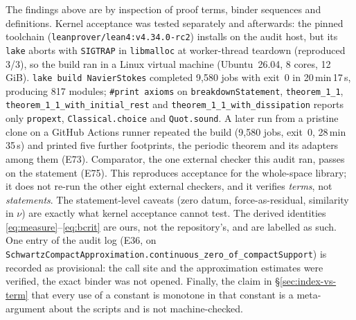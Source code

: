 \documentclass[11pt]{article}
\newcommand{\ct}[1]{\texttt{#1}}
\theoremstyle{plain}
\theoremstyle{definition}
\theoremstyle{remark}
\begin{document}
The findings above are by inspection of proof terms, binder sequences and
definitions. Kernel acceptance was tested separately and afterwards: the pinned
toolchain (\ct{leanprover/lean4:v4.34.0-rc2}) installs on the audit host, but its
\ct{lake} aborts with \ct{SIGTRAP} in \ct{libmalloc} at worker-thread teardown
(reproduced 3/3), so the build ran in a Linux virtual machine (Ubuntu~26.04,
8 cores, 12\,GiB). \ct{lake build NavierStokes} completed 9,580 jobs with exit~0
in 20\,min\,17\,s, producing 817 modules; \ct{\#print axioms} on
\ct{breakdownStatement}, \ct{theorem\_1\_1},
\ct{theorem\_1\_1\_with\_initial\_rest} and
\ct{theorem\_1\_1\_with\_dissipation} reports only \ct{propext},
\ct{Classical.choice} and \ct{Quot.sound}. A later run from a pristine clone on a
GitHub Actions runner repeated the build (9,580 jobs, exit~0, 28\,min\,35\,s) and
printed five further footprints, the periodic theorem and its adapters among them
(E73). Comparator, the one external checker this audit ran, passes on the statement (E75). This reproduces acceptance for the
whole-space library; it does not re-run the other eight external checkers, and it
verifies \emph{terms}, not \emph{statements}. The statement-level caveats (zero
datum, force-as-residual, similarity in $\nu$) are exactly what kernel acceptance
cannot test. The derived identities
\eqref{eq:measure}--\eqref{eq:bcrit} are ours, not the repository's, and are
labelled as such. One entry of the audit log (E36, on
\ct{SchwartzCompactApproximation.continuous\_zero\_of\_compactSupport}) is
recorded as provisional: the call site and the approximation estimates were
verified, the exact binder was not opened. Finally, the claim in
\S\ref{sec:index-vs-term} that every use of a constant is monotone in that
constant is a meta-argument about the scripts and is not machine-checked.
\end{document}
